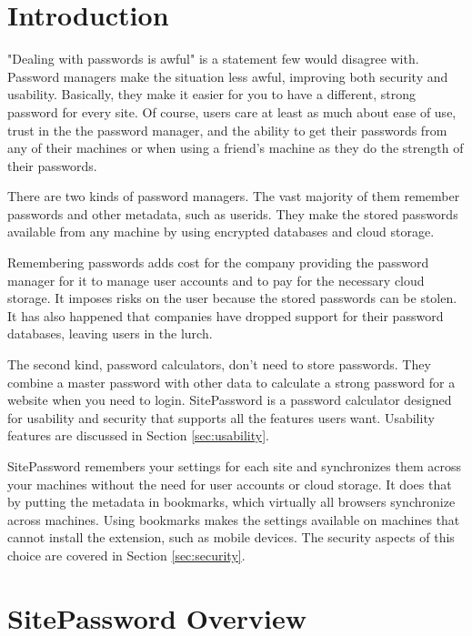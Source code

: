 \section{Introduction}\label{intro}

"Dealing with passwords is awful" is a statement few would disagree with.  Password managers make the situation less awful, improving both security and usability.  Basically, they make it easier for you to have a different, strong password for every site.  Of course, users care at least as much about ease of use, trust in the the password manager, and the ability to get their passwords from any of their machines or when using a friend's machine as they do the strength of their passwords.

There are two kinds of password managers.  The vast majority of them remember passwords and other metadata, such as userids.   They  make the stored passwords available from any machine by using  encrypted databases and cloud storage.

Remembering passwords adds cost for the company providing the password manager for it to manage user accounts and to pay for the necessary cloud storage.  It imposes risks on the user because the stored passwords can be stolen.  It has also happened that companies have dropped support for their password databases, leaving users in the lurch.

The second kind, password calculators, don't need to store passwords.  They combine a master password with other data to calculate a strong password for a website when you need to login.  SitePassword is a password calculator designed for usability and security that supports all the features users want.  Usability features are discussed in Section \ref{sec:usability}.

SitePassword remembers your settings for each site and synchronizes them across your machines without the need for user accounts or cloud storage.  It does that by putting the metadata in bookmarks, which virtually all browsers synchronize across machines.  Using bookmarks makes the settings available on machines that cannot install the extension, such as mobile devices. The security aspects of this choice are covered in Section \ref{sec:security}.  

\section{SitePassword Overview}\label{sec:overview}

